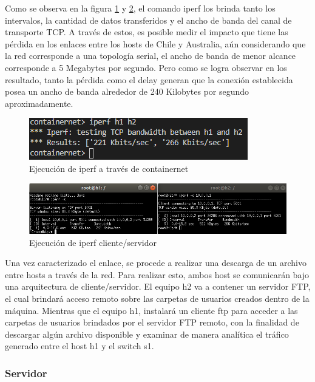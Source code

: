 \documentclass[10pt]{article}
\begin{document}
\noindent
Como se observa en la figura \ref{fig:item04_iperf} y \ref{fig:item04_iperf02}, el comando iperf los brinda tanto los intervalos, la cantidad de datos transferidos y el ancho de banda del canal de transporte TCP. A través de estos, es posible medir el impacto que tiene las pérdida en los enlaces entre los hosts de Chile y Australia, aún considerando que la red corresponde a una topología serial, el ancho de banda de menor alcance corresponde a 5 Megabytes por segundo. Pero como se logra observar en los resultado, tanto la pérdida como el delay generan que la conexión establecida posea un ancho de banda alrededor de 240 Kilobytes por segundo aproximadamente.


\begin{figure}[H]
    \centering
    \includegraphics[width=0.6\linewidth]{Imagenes/iperf.png}
    \caption{Ejecución de iperf a través de containernet}
    \label{fig:item04_iperf}
\end{figure}

\begin{figure}[H]
    \centering
    \includegraphics[width=1\linewidth]{Imagenes/iperf2.png}
    \caption{Ejecución de iperf cliente/servidor}
    \label{fig:item04_iperf02}
\end{figure}

Una vez caracterizado el enlace, se procede a realizar una descarga de un archivo entre hosts a través de la red. Para realizar esto, ambos host se comunicarán bajo una arquitectura de cliente/servidor. El equipo h2 va a contener un servidor FTP, el cual brindará acceso remoto sobre las carpetas de usuarios creados dentro de la máquina. Mientras que el equipo h1, instalará un cliente ftp para acceder a las carpetas de usuarios brindados por el servidor FTP remoto, con la finalidad de descargar algún archivo disponible y examinar de manera analítica el tráfico generado entre el host h1 y el switch s1. 

\subsubsection*{Servidor}
\end{document}
